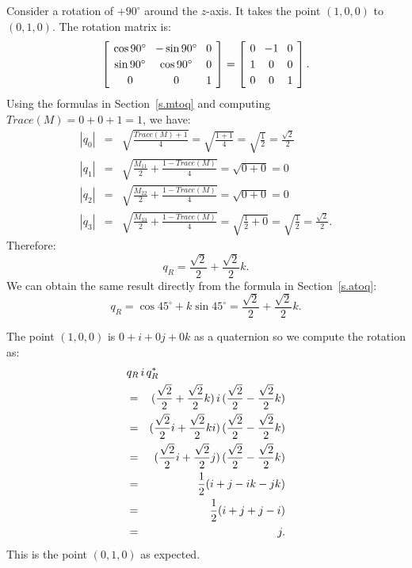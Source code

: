 \documentclass[11pt,a4paper]{report}
\newcommand*{\spacearray}{
\renewcommand{\arraystretch}{1.2}
\setlength{\arraycolsep}{4pt}
}
\begin{document}
Consider a rotation of $+90^\circ$ around the $z$-axis. It takes the point $(1,0,0)$ to $(0,1,0)$. The rotation matrix is:
\begin{displaymath}
\spacearray
\left[
\begin{array}{ccc}
\cos 90^\circ & -\sin 90^\circ & 0\\
\sin 90^\circ & \cos 90^\circ & 0\\
0&0&1\\
\end{array}
\right] =
\left[
\begin{array}{ccc}
0 & -1 & 0\\
1  & 0 & 0\\
0&0&1\\
\end{array}
\right].
\end{displaymath}
Using the formulas in Section~\ref{s.mtoq} and computing $\textit{Trace}(M)=0+0+1=1$, we have:
\begin{eqnarray*}
|q_0|&=&\sqrt{\frac{\textit{Trace}(M)+1}{4}}=\sqrt{\frac{1+1}{4}}=
\sqrt{\frac{1}{2}}=\frac{\sqrt{2}}{2}\\
|q_1|&=&\sqrt{\frac{M_{11}}{2}+\frac{1-\textit{Trace}(M)}{4}}=
\sqrt{0+0}=0\\
|q_2|&=&\sqrt{\frac{M_{22}}{2}+\frac{1-\textit{Trace}(M)}{4}}=
\sqrt{0+0}=0\\
|q_3|&=&\sqrt{\frac{M_{33}}{2}+\frac{1-\textit{Trace}(M)}{4}}=
\sqrt{\frac{1}{2}+0}=\sqrt{\frac{1}{2}}=\frac{\sqrt{2}}{2}.
\end{eqnarray*}
Therefore:
\begin{displaymath}
q_R = \frac{\sqrt{2}}{2} + \frac{\sqrt{2}}{2}k.
\end{displaymath}
We can obtain the same result directly from the formula in Section~\ref{s.atoq}:
\begin{displaymath}
q_R = \cos 45^\circ + k\sin 45^\circ = \frac{\sqrt{2}}{2} + \frac{\sqrt{2}}{2}k. 
\end{displaymath}

The point $(1,0,0)$ is $0+i+0j+0k$ as a quaternion so we compute the rotation as:
\begin{eqnarray*}
\lefteqn{q_R\, i \, q_R^*}\\
&=&(\frac{\sqrt{2}}{2} + \frac{\sqrt{2}}{2}k)\, i \, (\frac{\sqrt{2}}{2} -
 \frac{\sqrt{2}}{2}k)\\
&=&(\frac{\sqrt{2}}{2}i + \frac{\sqrt{2}}{2}ki)\, (\frac{\sqrt{2}}{2} -
 \frac{\sqrt{2}}{2}k)\\
&=&(\frac{\sqrt{2}}{2}i + \frac{\sqrt{2}}{2}j)\, (\frac{\sqrt{2}}{2} -
 \frac{\sqrt{2}}{2}k)\\
&=&\frac{1}{2}(i+j-ik-jk)\\
&=&\frac{1}{2}(i+j+j-i)\\
&=&j.
\end{eqnarray*}
This is the point $(0,1,0)$ as expected.
\end{document}

